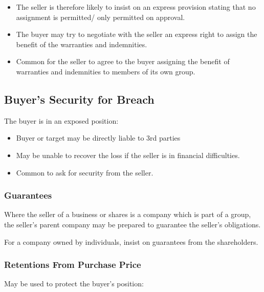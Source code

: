 \documentclass[
]{article}
\providecommand{\tightlist}{%
  \setlength{\itemsep}{0pt}\setlength{\parskip}{0pt}}
\begin{document}
\begin{itemize}
\tightlist
\item
  The seller is therefore likely to insist on an express provision
  stating that no assignment is permitted/ only permitted on approval.
\item
  The buyer may try to negotiate with the seller an express right to
  assign the benefit of the warranties and indemnities.
\item
  Common for the seller to agree to the buyer assigning the benefit of
  warranties and indemnities to members of its own group.
\end{itemize}

\hypertarget{buyers-security-for-breach}{%
\subsection{Buyer's Security for
Breach}\label{buyers-security-for-breach}}

The buyer is in an exposed position:

\begin{itemize}
\tightlist
\item
  Buyer or target may be directly liable to 3rd parties
\item
  May be unable to recover the loss if the seller is in financial
  difficulties.
\item
  Common to ask for security from the seller.
\end{itemize}

\hypertarget{guarantees}{%
\subsubsection{Guarantees}\label{guarantees}}

Where the seller of a business or shares is a company which is part of a
group, the seller's parent company may be prepared to guarantee the
seller's obligations.

For a company owned by individuals, insist on guarantees from the
shareholders.

\hypertarget{retentions-from-purchase-price}{%
\subsubsection{Retentions From Purchase
Price}\label{retentions-from-purchase-price}}

May be used to protect the buyer's position:
\end{document}
